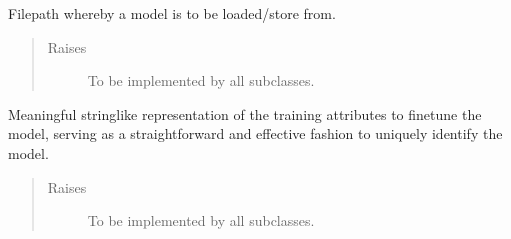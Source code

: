 \documentclass[letterpaper,10pt,english]{sphinxmanual}
\begin{document}
\begin{fulllineitems}
\begin{fulllineitems}
\begin{quote}
\begin{description}
\end{description}\end{quote}

\end{fulllineitems}


\begin{fulllineitems}
\label{\detokenize{code:gpt2_summarizer.GPT2Summarizer._model_file}}
\sphinxAtStartPar
Filepath whereby a model is to be loaded/store from.
\begin{quote}\begin{description}
\item[{Raises}] \leavevmode
\sphinxAtStartPar
{} \textendash{} To be implemented by all subclasses.

\end{description}\end{quote}

\end{fulllineitems}


\begin{fulllineitems}
\label{\detokenize{code:gpt2_summarizer.GPT2Summarizer.attrs_to_str}}
\sphinxAtStartPar
Meaningful string\sphinxhyphen{}like representation of the training attributes to fine\sphinxhyphen{}tune the model,
serving as a straightforward and effective fashion to uniquely identify the model.
\begin{quote}\begin{description}
\item[{Raises}] \leavevmode
\sphinxAtStartPar
{} \textendash{} To be implemented by all subclasses.

\end{description}\end{quote}

\end{fulllineitems}



\end{fulllineitems}
\end{document}
